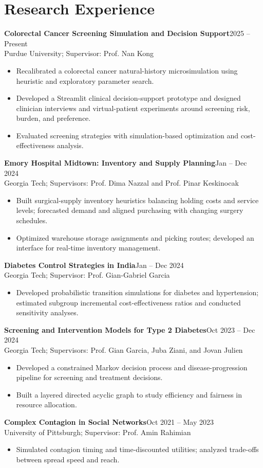 \documentclass[letterpaper,10pt]{article}
\newcommand{\job}[3]{\textbf{#1}\hfill #2\\{\small #3}\par}
\begin{document}
\section{Research Experience}
\job{Colorectal Cancer Screening Simulation and Decision Support}{2025 -- Present}{Purdue University; Supervisor: Prof. Nan Kong}
\begin{itemize}
\item Recalibrated a colorectal cancer natural-history microsimulation using heuristic and exploratory parameter search.
\item Developed a Streamlit clinical decision-support prototype and designed clinician interviews and virtual-patient experiments around screening risk, burden, and preference.
\item Evaluated screening strategies with simulation-based optimization and cost-effectiveness analysis.
\end{itemize}
\job{Emory Hospital Midtown: Inventory and Supply Planning}{Jan -- Dec 2024}{Georgia Tech; Supervisors: Prof. Dima Nazzal and Prof. Pinar Keskinocak}
\begin{itemize}
\item Built surgical-supply inventory heuristics balancing holding costs and service levels; forecasted demand and aligned purchasing with changing surgery schedules.
\item Optimized warehouse storage assignments and picking routes; developed an interface for real-time inventory management.
\end{itemize}
\job{Diabetes Control Strategies in India}{Jan -- Dec 2024}{Georgia Tech; Supervisor: Prof. Gian-Gabriel Garcia}
\begin{itemize}
\item Developed probabilistic transition simulations for diabetes and hypertension; estimated subgroup incremental cost-effectiveness ratios and conducted sensitivity analyses.
\end{itemize}
\job{Screening and Intervention Models for Type 2 Diabetes}{Oct 2023 -- Dec 2024}{Georgia Tech; Supervisors: Prof. Gian Garcia, Juba Ziani, and Jovan Julien}
\begin{itemize}
\item Developed a constrained Markov decision process and disease-progression pipeline for screening and treatment decisions.
\item Built a layered directed acyclic graph to study efficiency and fairness in resource allocation.
\end{itemize}
\job{Complex Contagion in Social Networks}{Oct 2021 -- May 2023}{University of Pittsburgh; Supervisor: Prof. Amin Rahimian}
\begin{itemize}
\item Simulated contagion timing and time-discounted utilities; analyzed trade-offs between spread speed and reach.
\end{itemize}
\end{document}
